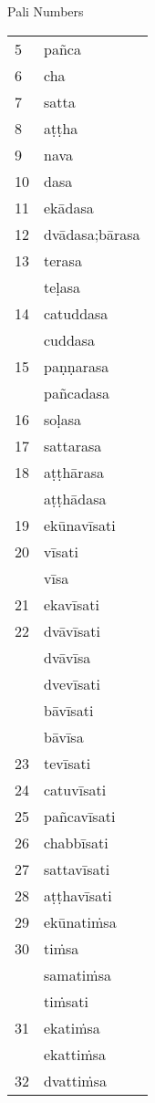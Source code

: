 \makeatletter
\let\mcnewpage=\newpage
\newcommand{\TrickSupertabularIntoMulticols}{%
  \renewcommand\newpage{%
    \if@firstcolumn
      \hrule width\linewidth height0pt
      \columnbreak
    \else
      \mcnewpage
    \fi
  }%
}
\makeatother
{\large Pali Numbers}
\begin{multicols}{4}
\TrickSupertabularIntoMulticols
\begin{supertabular}{l|l}
5	&	pañca\\
6	&	cha\\
7	&	satta\\
8	&	aṭṭha\\
9	&	nava\\
10	&	dasa\\
11	&	ekādasa\\
12	&	dvādasa;bārasa\\
13	&	terasa\\
	&	teḷasa\\
14	&	catuddasa\\
	&	cuddasa\\
15	&	paṇṇarasa\\
	&	pañcadasa\\
16	&	soḷasa\\
17	&	sattarasa\\
18	&	aṭṭhārasa\\
	&	aṭṭhādasa\\
19	&	ekūnavīsati\\
20	&	vīsati\\
	&	vīsa\\
21	&	ekavīsati\\
22	&	dvāvīsati\\
	&	dvāvīsa\\
	&	dvevīsati\\
	&	bāvīsati\\
	&	bāvīsa\\
23	&	tevīsati\\
24	&	catuvīsati\\
25	&	pañcavīsati\\
26	&	chabbīsati\\
27	&	sattavīsati\\
28	&	aṭṭhavīsati\\
29	&	ekūnatiṁsa\\
30	&	tiṁsa\\
	&	samatiṁsa\\
	&	tiṁsati\\
31	&	ekatiṁsa\\
	&	ekattiṁsa\\
32	&	dvattiṁsa\\

\end{supertabular}
\end{multicols}
